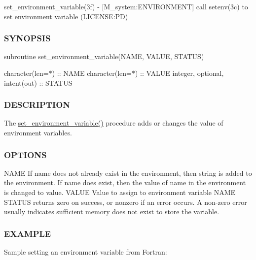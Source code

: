 set\+\_\+environment\+\_\+variable(3f) -\/ \mbox{[}M\+\_\+system\+:E\+N\+V\+I\+R\+O\+N\+M\+E\+NT\mbox{]} call setenv(3c) to set environment variable (L\+I\+C\+E\+N\+SE\+:PD) 

\subsubsection*{S\+Y\+N\+O\+P\+S\+IS}

subroutine set\+\_\+environment\+\_\+variable(\+N\+A\+M\+E, V\+A\+L\+U\+E, S\+T\+A\+T\+U\+S)

character(len=$\ast$) \+:\+: N\+A\+ME character(len=$\ast$) \+:\+: V\+A\+L\+UE integer, optional, intent(out) \+:\+: S\+T\+A\+T\+US

\subsubsection*{D\+E\+S\+C\+R\+I\+P\+T\+I\+ON}

The \mbox{\hyperlink{namespacem__system_ad813765403a5d9d6fb7a2edcb669fe4b}{set\+\_\+environment\+\_\+variable()}} procedure adds or changes the value of environment variables.

\subsubsection*{O\+P\+T\+I\+O\+NS}

N\+A\+ME If name does not already exist in the environment, then string is added to the environment. If name does exist, then the value of name in the environment is changed to value. V\+A\+L\+UE Value to assign to environment variable N\+A\+ME S\+T\+A\+T\+US returns zero on success, or nonzero if an error occurs. A non-\/zero error usually indicates sufficient memory does not exist to store the variable.

\subsubsection*{E\+X\+A\+M\+P\+LE}

Sample setting an environment variable from Fortran\+:

